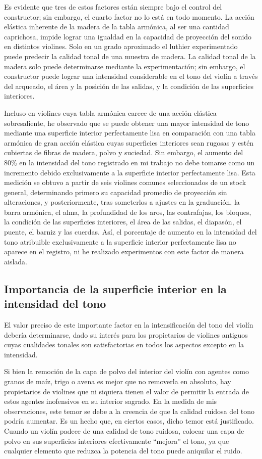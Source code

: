 \documentclass[12pt]{book}
\begin{document}
Es evidente que tres de estos factores están siempre bajo el control del constructor; sin embargo, el cuarto factor no lo está en todo momento. La acción elástica inherente de la madera de la tabla armónica, al ser una cantidad caprichosa, impide lograr una igualdad en la capacidad de proyección del sonido en distintos violines. Solo en un grado aproximado el luthier experimentado puede predecir la calidad tonal de una muestra de madera. La calidad tonal de la madera solo puede determinarse mediante la experimentación; sin embargo, el constructor puede lograr una intensidad considerable en el tono del violín a través del arqueado, el área y la posición de las salidas, y la condición de las superficies interiores.

Incluso en violines cuya tabla armónica carece de una acción elástica sobresaliente, he observado que se puede obtener una mayor intensidad de tono mediante una superficie interior perfectamente lisa en comparación con una tabla armónica de gran acción elástica cuyas superficies interiores sean rugosas y estén cubiertas de fibras de madera, polvo y suciedad. Sin embargo, el aumento del 80\% en la intensidad del tono registrado en mi trabajo no debe tomarse como un incremento debido exclusivamente a la superficie interior perfectamente lisa. Esta medición se obtuvo a partir de seis violines comunes seleccionados de un stock general, determinando primero su capacidad promedio de proyección sin alteraciones, y posteriormente, tras someterlos a ajustes en la graduación, la barra armónica, el alma, la profundidad de los aros, las contrafajas, los bloques, la condición de las superficies interiores, el área de las salidas, el diapasón, el puente, el barniz y las cuerdas. Así, el porcentaje de aumento en la intensidad del tono atribuible exclusivamente a la superficie interior perfectamente lisa no aparece en el registro, ni he realizado experimentos con este factor de manera aislada.

\subsection*{Importancia de la superficie interior en la intensidad del tono}

El valor preciso de este importante factor en la intensificación del tono del violín debería determinarse, dado su interés para los propietarios de violines antiguos cuyas cualidades tonales son satisfactorias en todos los aspectos excepto en la intensidad.

Si bien la remoción de la capa de polvo del interior del violín con agentes como granos de maíz, trigo o avena es mejor que no removerla en absoluto, hay propietarios de violines que ni siquiera tienen el valor de permitir la entrada de estos agentes inofensivos en su interior sagrado. En la medida de mis observaciones, este temor se debe a la creencia de que la calidad ruidosa del tono podría aumentar. Es un hecho que, en ciertos casos, dicho temor está justificado. Cuando un violín padece de una calidad de tono ruidosa, colocar una capa de polvo en sus superficies interiores efectivamente ``mejora'' el tono, ya que cualquier elemento que reduzca la potencia del tono puede aniquilar el ruido.
\end{document}
